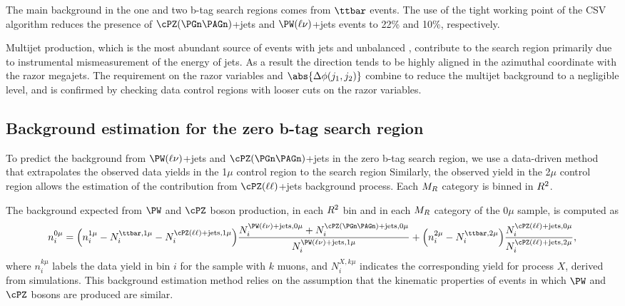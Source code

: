 The main background in the one and two b-tag search regions comes from $\ttbar$ events. 
The use of the tight working point of the CSV
algorithm reduces the presence of $\cPZ(\PGn\PAGn)$+jets
and $\PW(\ell\nu)$+jets events to 22\% and 10\%, respectively.

Multijet production, which is the most abundant source of events with jets and
unbalanced \pt, contribute to the search region primarily due to 
instrumental mismeasurement of the energy of jets. As a result the
\MET direction tends to be highly aligned in the azimuthal coordinate with
the razor megajets. The requirement on the razor variables and 
$\abs{ \Delta\phi (j_{1}, j_{2})}$ combine to reduce the multijet
background to a negligible level, and is confirmed by checking 
data control regions with looser cuts on the razor variables.

\subsection{Background estimation for the zero b-tag search region} 
\label{sec:bkgzmu}

To predict the background from $\PW(\ell\nu)$+jets and $\cPZ(\PGn\PAGn)$+jets in 
the zero b-tag search region, we use a data-driven method that extrapolates
the observed data yields in the 1$\mu$ control region to the search region
Similarly, the observed yield in the 2$\mu$ control region allows the estimation of
the contribution from $\cPZ(\ell \ell)$+jets background process. Each
$M_R$ category is binned in $R^2$. 

The background expected from $\PW$ and $\cPZ$ boson production, in
each $R^2$ bin and in each $M_R$ category of the 0$\mu$
sample, is computed as
\begin{equation}
  n_{i}^{0\mu} =  \Bigl(n_{i}^{1\mu} - N_{i}^{\ttbar,1\mu} - N_{i}^{\cPZ(\ell
    \ell)+\text{jets},1\mu}\Bigr) \frac{N_{i}^{\PW(\ell\nu)+\text{jets},0\mu}+N_{i}^{\cPZ(\PGn\PAGn)+\text{jets},0\mu}}{N_{i}^{\PW(\ell\nu)+\text{jets},1\mu}} +
\Bigl(n_{i}^{2\mu} - N_{i}^{\ttbar,2\mu}\Bigr) \frac{N_{i}^{\cPZ(\ell \ell)+\text{jets},0\mu}}{N_{i}^{\cPZ(\ell \ell)+\text{jets},2\mu}},
\label{eqn:pred}
\end{equation}
where $n_{i}^{k\mu}$ labels the data yield in bin $i$ for the sample
with $k$ muons, and $N_{i}^{X,k\mu}$ indicates the corresponding yield
for process $X$, derived from simulations. This background estimation method relies on 
the assumption that the kinematic properties of events in which $\PW$ and $\cPZ$ bosons are
produced are similar.

